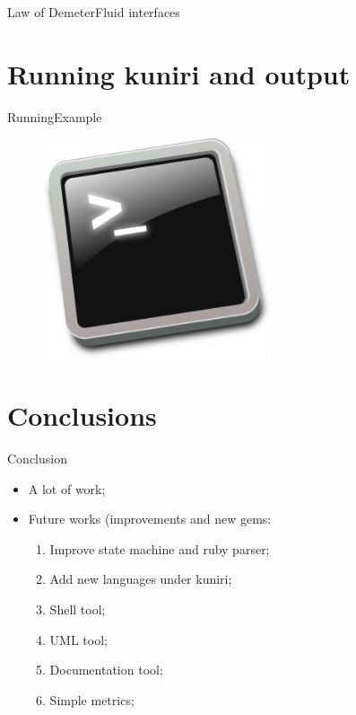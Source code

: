 \documentclass[10pt]{beamer}
\begin{document}
\begin{frame}{Law of Demeter}{Fluid interfaces}
\end{frame}

\section{Running kuniri and output}
\begin{frame}{Running}{Example}
  \begin{figure}[overview]
    \includegraphics[width=0.6\textwidth]{images/terminal.png}
  \end{figure}
\end{frame}

\section{Conclusions}
\begin{frame}{Conclusion}{}
  \begin{itemize}
    \item A lot of work;
    \item Future works (improvements and new gems:
      \begin{enumerate}
        \item Improve state machine and ruby parser;
        \item Add new languages under kuniri;
        \item Shell tool;
        \item UML tool;
        \item Documentation tool;
        \item Simple metrics;
      \end{enumerate}
  \end{itemize}
\end{frame}

{\1
\begin{frame}
\end{frame}}
\end{document}
